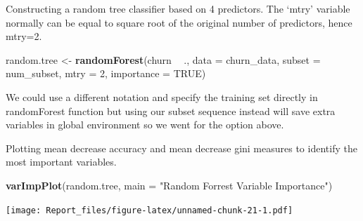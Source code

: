 \documentclass[
]{article}
\newenvironment{Shaded}{\begin{snugshade}}{\end{snugshade}}
\newcommand{\DataTypeTok}[1]{\textcolor[rgb]{0.13,0.29,0.53}{#1}}
\newcommand{\DecValTok}[1]{\textcolor[rgb]{0.00,0.00,0.81}{#1}}
\newcommand{\KeywordTok}[1]{\textcolor[rgb]{0.13,0.29,0.53}{\textbf{#1}}}
\newcommand{\NormalTok}[1]{#1}
\newcommand{\OperatorTok}[1]{\textcolor[rgb]{0.81,0.36,0.00}{\textbf{#1}}}
\newcommand{\OtherTok}[1]{\textcolor[rgb]{0.56,0.35,0.01}{#1}}
\newcommand{\StringTok}[1]{\textcolor[rgb]{0.31,0.60,0.02}{#1}}
\begin{document}
\begin{Shaded}
\end{Shaded}

Constructing a random tree classifier based on 4 predictors. The `mtry'
variable normally can be equal to square root of the original number of
predictors, hence mtry=2.

\begin{Shaded}
\begin{Highlighting}[]
\NormalTok{random.tree <-}\StringTok{ }\KeywordTok{randomForest}\NormalTok{(churn }\OperatorTok{~}\StringTok{ }\NormalTok{., }\DataTypeTok{data =}\NormalTok{ churn_data, }\DataTypeTok{subset =}\NormalTok{ num_subset, }\DataTypeTok{mtry =} \DecValTok{2}\NormalTok{, }\DataTypeTok{importance =} \OtherTok{TRUE}\NormalTok{)}
\end{Highlighting}
\end{Shaded}

We could use a different notation and specify the training set directly
in randomForest function but using our subset sequence instead will save
extra variables in global environment so we went for the option above.

Plotting mean decrease accuracy and mean decrease gini measures to
identify the most important variables.

\begin{Shaded}
\begin{Highlighting}[]
\KeywordTok{varImpPlot}\NormalTok{(random.tree, }\DataTypeTok{main =} \StringTok{"Random Forrest Variable Importance"}\NormalTok{)}
\end{Highlighting}
\end{Shaded}

\texttt{[image: Report\_files/figure-latex/unnamed-chunk-21-1.pdf]}
\end{document}
